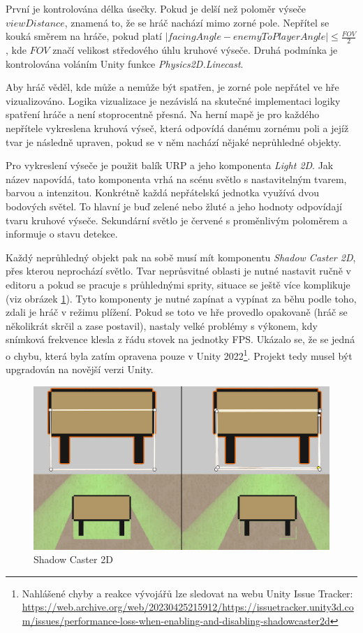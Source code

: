 \documentclass[FM,Proj,bw]{tulthesis}
\begin{document}
	První je kontrolována délka úsečky. Pokud je delší než poloměr výseče $viewDistance$, znamená to, že se hráč nachází mimo zorné pole. Nepřítel se kouká směrem na hráče, pokud platí $|facingAngle - enemyToPlayerAngle| \le \frac{FOV}{2}$, kde $FOV$ značí velikost středového úhlu kruhové výseče. Druhá podmínka je kontrolována voláním Unity funkce \textit{Physics2D.Linecast}.
		
	Aby hráč věděl, kde může a nemůže být spatřen, je zorné pole nepřátel ve hře vizualizováno. Logika vizualizace je nezávislá na skutečné implementaci logiky spatření hráče a není stoprocentně přesná. Na herní mapě je pro každého nepřítele vykreslena kruhová výseč, která odpovídá danému zornému poli a jejíž tvar je následně upraven, pokud se v něm nachází nějaké neprůhledné objekty.
	
	Pro vykreslení výseče je použit balík URP a jeho komponenta \textit{Light 2D}. Jak název napovídá, tato komponenta vrhá na scénu světlo s nastavitelným tvarem, barvou a intenzitou. Konkrétně každá nepřátelská jednotka využívá dvou bodových světel. To hlavní je buď zelené nebo žluté a jeho hodnoty odpovídají tvaru kruhové výseče. Sekundární světlo je červené s proměnlivým poloměrem a informuje o stavu detekce.
	
	Každý neprůhledný objekt pak na sobě musí mít komponentu \textit{Shadow Caster 2D}, přes kterou neprochází světlo. Tvar neprůsvitné oblasti je nutné nastavit ručně v editoru a pokud se pracuje s průhlednými sprity, situace se ještě více komplikuje (viz obrázek \ref{imgSC2D}). Tyto komponenty je nutné zapínat a vypínat za běhu podle toho, zdali je hráč v režimu plížení. Pokud se toto ve hře provedlo opakovaně (hráč se několikrát skrčil a zase postavil), nastaly velké problémy s výkonem, kdy snímková frekvence klesla z řádu stovek na jednotky FPS. Ukázalo se, že se jedná o chybu, která byla zatím opravena pouze v Unity 2022\footnote{Nahlášené chyby a reakce vývojářů lze sledovat na webu Unity Issue Tracker:\\ \url{https://web.archive.org/web/20230425215912/https://issuetracker.unity3d.com/issues/performance-loss-when-enabling-and-disabling-shadowcaster2d}}. Projekt tedy musel být upgradován na novější verzi Unity.
	
	\begin{figure}[ht]
		\centering
		\includegraphics[width=.75\textwidth]{img/ShadowCaster}
		\caption{Shadow Caster 2D}
		\label{imgSC2D}
	\end{figure}
	
\end{document}
